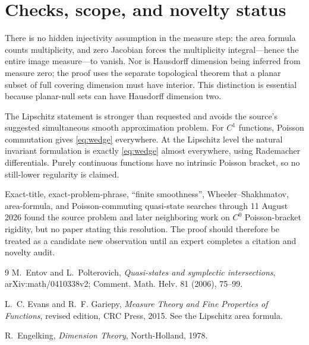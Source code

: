 \documentclass[11pt]{article}
\begin{document}
\section{Checks, scope, and novelty status}

There is no hidden injectivity assumption in the measure step: the area
formula counts multiplicity, and zero Jacobian forces the multiplicity
integral---hence the entire image measure---to vanish.  Nor is Hausdorff
dimension being inferred from measure zero; the proof uses the separate
topological theorem that a planar subset of full covering dimension must
have interior.  This distinction is essential because planar-null sets can
have Hausdorff dimension two.

The Lipschitz statement is stronger than requested and avoids the source's
suggested simultaneous smooth approximation problem.  For $C^1$ functions,
Poisson commutation gives \eqref{eq:wedge} everywhere.  At the Lipschitz
level the natural invariant formulation is exactly \eqref{eq:wedge} almost
everywhere, using Rademacher differentials.  Purely continuous functions
have no intrinsic Poisson bracket, so no still-lower regularity is claimed.

Exact-title, exact-problem-phrase, ``finite smoothness'',
Wheeler--Shakhmatov, area-formula, and Poisson-commuting quasi-state searches
through 11 August 2026 found the source problem and later neighboring work
on $C^0$ Poisson-bracket rigidity, but no paper stating this resolution.
The proof should therefore be treated as a candidate new observation until
an expert completes a citation and novelty audit.

\begin{thebibliography}{9}
M.~Entov and L.~Polterovich,
\emph{Quasi-states and symplectic intersections},
arXiv:math/0410338v2; Comment. Math. Helv. 81 (2006), 75--99.

L.~C. Evans and R.~F. Gariepy,
\emph{Measure Theory and Fine Properties of Functions}, revised edition,
CRC Press, 2015.  See the Lipschitz area formula.

R.~Engelking,
\emph{Dimension Theory}, North-Holland, 1978.
\end{thebibliography}
\end{document}
